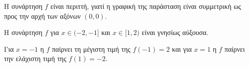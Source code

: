 \begin{alist}
\item Η συνάρτηση $f$ είναι περιττή, γιατί η γραφική της παράσταση είναι συμμετρική ως προς την αρχή των αξόνων $(0,0)$.
\item Η συνάρτηση $f$ για $x \in (-2, -1]$ και $x \in [1, 2)$ είναι γνησίως αύξουσα.
\item Για $x = -1$ η $f$ παίρνει τη μέγιστη τιμή της $f(-1) = 2$ και για $x = 1$ η $f$ παίρνει την ελάχιστη τιμή της $f(1) = -2$.
\end{alist}

